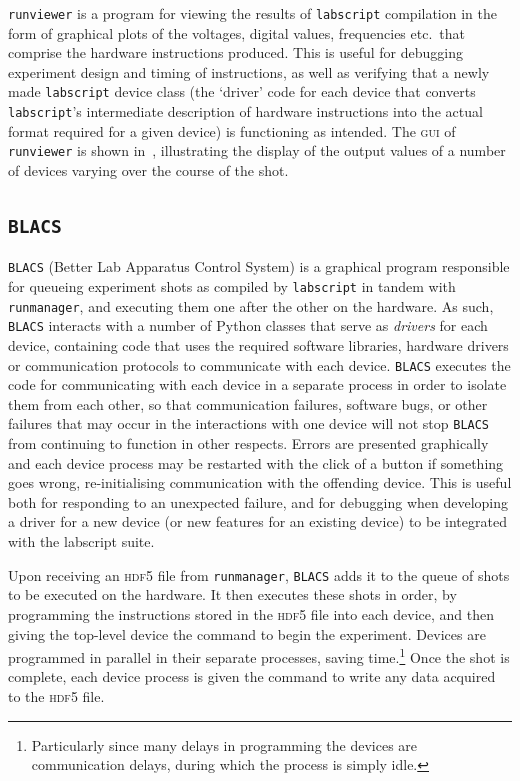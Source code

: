 \texttt{runviewer} is a program for viewing the results of \texttt{labscript} compilation in the form of graphical plots of the voltages, digital values, frequencies etc.~that comprise the hardware instructions produced. This is useful for debugging experiment design and timing of instructions, as well as verifying that a newly made \texttt{labscript} device class (the `driver' code for each device that converts \texttt{labscript}'s intermediate description of hardware instructions into the actual format required for a given device) is functioning as intended. The \textsc{gui} of \texttt{runviewer} is shown in~, illustrating the display of the output values of a number of devices varying over the course of the shot.

\subsection{\texttt{BLACS}}

\texttt{BLACS} (Better Lab Apparatus Control System) is a graphical program responsible for queueing experiment shots as compiled by \texttt{labscript} in tandem with \texttt{runmanager}, and executing them one after the other on the hardware. As such, \texttt{BLACS} interacts with a number of Python classes that serve as \emph{drivers} for each device, containing code that uses the required software libraries, hardware drivers or communication protocols to communicate with each device. \texttt{BLACS} executes the code for communicating with each device in a separate process in order to isolate them from each other, so that communication failures, software bugs, or other failures that may occur in the interactions with one device will not stop \texttt{BLACS} from continuing to function in other respects. Errors are presented graphically and each device process may be restarted with the click of a button if something goes wrong, re-initialising communication with the offending device. This is useful both for responding to an unexpected failure, and for debugging when developing a driver for a new device (or new features for an existing device) to be integrated with the labscript suite.

Upon receiving an \textsc{hdf5} file from \texttt{runmanager}, \texttt{BLACS} adds it to the queue of shots to be executed on the hardware. It then executes these shots in order, by programming the instructions stored in the \textsc{hdf5} file into each device, and then giving the top-level device the command to begin the experiment. Devices are programmed in parallel in their separate processes, saving time.\footnote{Particularly since many delays in programming the devices are communication delays, during which the process is simply idle.} Once the shot is complete, each device process is given the command to write any data acquired to the \textsc{hdf5} file.

